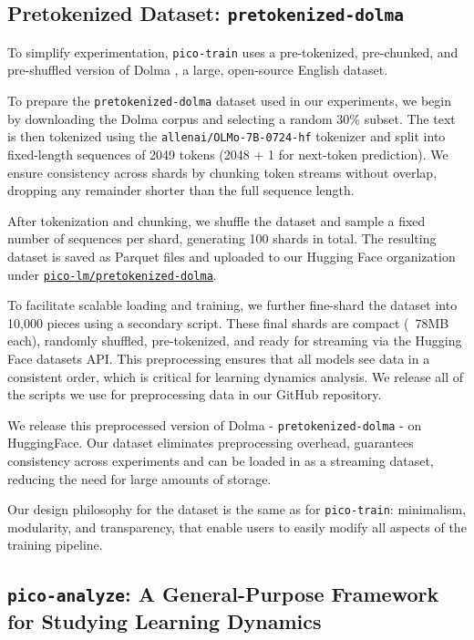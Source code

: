 \subsection{Pretokenized Dataset: \texttt{pretokenized-dolma}}

To simplify experimentation, \texttt{pico-train} uses a pre-tokenized, pre-chunked, and pre-shuffled version of Dolma \citep{soldaini2024dolma}, a large, open-source English dataset. 

To prepare the \texttt{pretokenized-dolma} dataset used in our experiments, we begin by downloading the Dolma corpus and selecting a random 30\% subset. The text is then tokenized using the \verb|allenai/OLMo-7B-0724-hf| tokenizer and split into fixed-length sequences of 2049 tokens (2048 + 1 for next-token prediction). We ensure consistency across shards by chunking token streams without overlap, dropping any remainder shorter than the full sequence length.

After tokenization and chunking, we shuffle the dataset and sample a fixed number of sequences per shard, generating 100 shards in total. The resulting dataset is saved as Parquet files and uploaded to our Hugging Face organization under \href{https://huggingface.co/datasets/pico-lm/pretokenized-dolma}{\texttt{pico-lm/pretokenized-dolma}}.

To facilitate scalable loading and training, we further fine-shard the dataset into 10,000 pieces using a secondary script. These final shards are compact (~78MB each), randomly shuffled, pre-tokenized, and ready for streaming via the Hugging Face datasets API. This preprocessing ensures that all models see data in a consistent order, which is critical for learning dynamics analysis. We release all of the scripts we use for preprocessing data in our GitHub repository.

We release this preprocessed version of Dolma - \texttt{pretokenized-dolma} - on HuggingFace. Our dataset eliminates preprocessing overhead, guarantees consistency across experiments and can be loaded in as a streaming dataset, reducing the need for large amounts of storage.

Our design philosophy for the dataset is the same as for \texttt{pico-train}: minimalism, modularity, and transparency, that enable users to easily modify all aspects of the training pipeline. 

\subsection{\texttt{pico-analyze}: A General-Purpose Framework for Studying Learning Dynamics}

